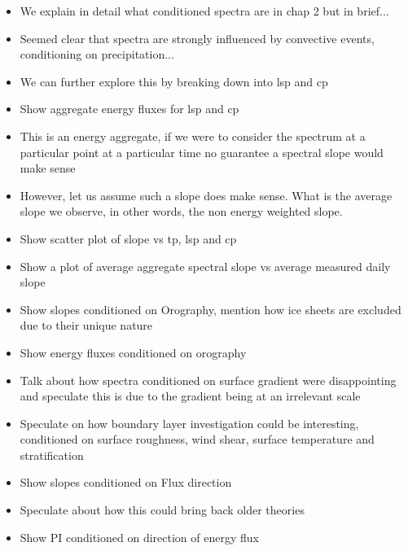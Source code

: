 \begin{itemize}

\item{We explain in detail what conditioned spectra are in chap 2 but in brief...}

\item{Seemed clear that spectra are strongly influenced by convective events, conditioning on precipitation... }

\item{We can further explore this by breaking down into lsp and cp}

\item{Show aggregate energy fluxes for lsp and cp}

\item{This is an energy aggregate, if we were to consider the spectrum at a particular point at a particular time no guarantee a spectral slope would make sense}

\item{However, let us assume such a slope does make sense. What is the average slope we observe, in other words, the non energy weighted slope.}

\item{Show scatter plot of slope vs tp, lsp and cp}

\item{Show a plot of average aggregate spectral slope vs average measured daily slope}

\item{Show slopes conditioned on Orography, mention how ice sheets are excluded due to their unique nature}

\item{Show energy fluxes conditioned on orography}

\item{Talk about how spectra conditioned on surface gradient were disappointing and speculate this is due to the gradient being at an irrelevant scale}

\item{Speculate on how boundary layer investigation could be interesting, conditioned on surface roughness, wind shear, surface temperature and stratification}

\item{Show slopes conditioned on Flux direction}

\item{Speculate about how this could bring back older theories}

\item{Show PI conditioned on direction of energy flux}


\end{itemize}
